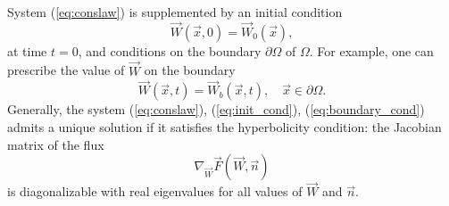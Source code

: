 \documentclass{svmult}
\begin{document}
System (\ref{eq:conslaw}) is supplemented by an initial condition
\begin{equation}\label{eq:init_cond}
  \vec{W}(\vec{x},0)=\vec{W}_0(\vec{x}),
\end{equation}
at time $t=0$, and conditions on the boundary $\partial \Omega$ of
$\Omega$. For example, one can prescribe the value of $\vec{W}$ on the
boundary
\begin{equation}\label{eq:boundary_cond}
\vec{W}(\vec{x},t)=\vec{W}_b(\vec{x},t),\quad \vec{x}\in\partial \Omega.
\end{equation}
Generally, the system (\ref{eq:conslaw}), (\ref{eq:init_cond}),
(\ref{eq:boundary_cond}) admits a unique solution if it satisfies the
hyperbolicity condition: the Jacobian matrix of the
flux \begin{equation}\nabla_{\vec{W}}
  \vec{F}(\vec{W},\vec{n})\end{equation} is diagonalizable with real
eigenvalues for all values of $\vec{W}$ and $\vec{n}$.
\end{document}
